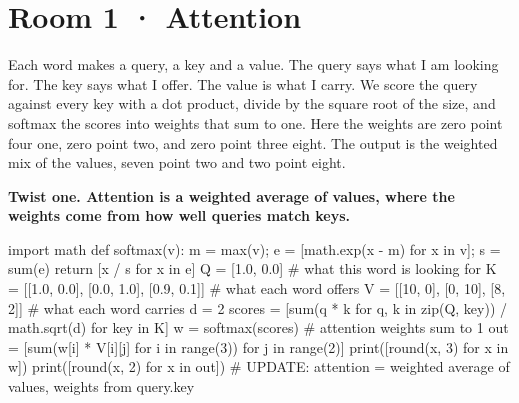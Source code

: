 \documentclass[11pt,a4paper]{report}
\begin{document}
\section*{Room 1 · Attention}
Each word makes a query, a key and a value. The query says what I am looking for. The key says what I offer. The value is what I carry. We score the query against every key with a dot product, divide by the square root of the size, and softmax the scores into weights that sum to one. Here the weights are zero point four one, zero point two, and zero point three eight. The output is the weighted mix of the values, seven point two and two point eight.
\begin{tcolorbox}[colback=yellow!12,colframe=orange!70!black,boxrule=0.4pt,left=4pt,right=4pt,top=2pt,bottom=2pt]\textbf{Twist one. Attention is a weighted average of values, where the weights come from how well queries match keys.}\end{tcolorbox}
\begin{Code}
import math
def softmax(v):
    m = max(v); e = [math.exp(x - m) for x in v]; s = sum(e)
    return [x / s for x in e]
Q = [1.0, 0.0]                              # what this word is looking for
K = [[1.0, 0.0], [0.0, 1.0], [0.9, 0.1]]    # what each word offers
V = [[10, 0], [0, 10], [8, 2]]              # what each word carries
d = 2
scores = [sum(q * k for q, k in zip(Q, key)) / math.sqrt(d) for key in K]
w = softmax(scores)                         # attention weights sum to 1
out = [sum(w[i] * V[i][j] for i in range(3)) for j in range(2)]
print([round(x, 3) for x in w])
print([round(x, 2) for x in out])
# UPDATE: attention = weighted average of values, weights from query.key
\end{Code}
\begin{Out}
[0.412, 0.203, 0.384]
[7.2, 2.8]
\end{Out}
\end{document}
